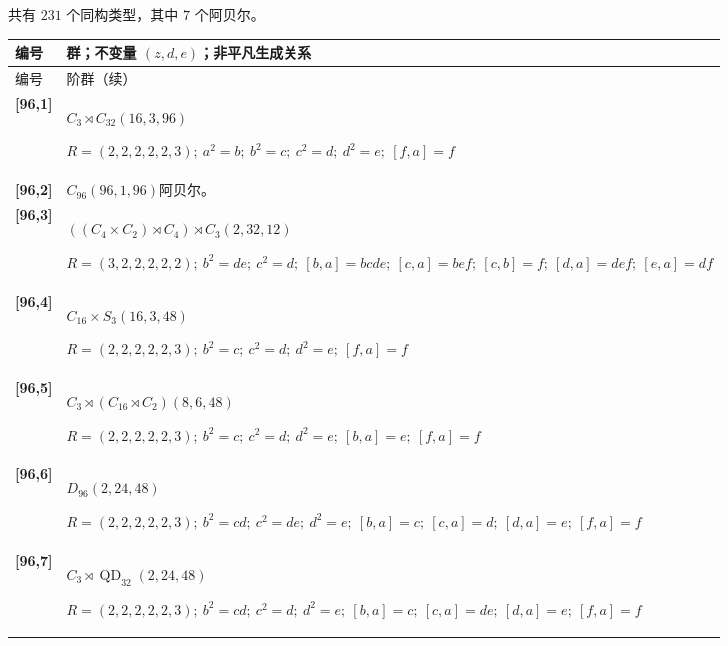 \documentclass[UTF8,fontset=fandol,11pt,a4paper]{ctexart}
\begin{document}
共有 $231$ 个同构类型，其中 $7$ 个阿贝尔。

\begingroup\small\setlength{\tabcolsep}{3pt}\renewcommand{\arraystretch}{1.12}

\begin{longtable}{@{}p{17mm}>{\raggedright\arraybackslash}p{141mm}@{}}

\toprule 编号 & 群；不变量 $(z,d,e)$；非平凡生成关系\\\midrule\endfirsthead

\toprule 编号 & 96 阶群（续）\\\midrule\endhead\bottomrule\endfoot

\textbf{[96,1]} & $C_{3}\rtimes C_{32}$\quad $(16,3,96)$\par\(R=(2,2,2,2,2,3);\allowbreak\ a^{2}=b;\allowbreak\ b^{2}=c;\allowbreak\ c^{2}=d;\allowbreak\ d^{2}=e;\allowbreak\ [f,a]=f\)\\[3pt]

\textbf{[96,2]} & $C_{96}$\quad $(96,1,96)$\quad 阿贝尔。\\[3pt]

\textbf{[96,3]} & $((C_{4}\times C_{2})\rtimes C_{4})\rtimes C_{3}$\quad $(2,32,12)$\par\(R=(3,2,2,2,2,2);\allowbreak\ b^{2}=de;\allowbreak\ c^{2}=d;\allowbreak\ [b,a]=bcde;\allowbreak\ [c,a]=bef;\allowbreak\ [c,b]=f;\allowbreak\ [d,a]=def;\allowbreak\ [e,a]=df\)\\[3pt]

\textbf{[96,4]} & $C_{16}\times S_{3}$\quad $(16,3,48)$\par\(R=(2,2,2,2,2,3);\allowbreak\ b^{2}=c;\allowbreak\ c^{2}=d;\allowbreak\ d^{2}=e;\allowbreak\ [f,a]=f\)\\[3pt]

\textbf{[96,5]} & $C_{3}\rtimes (C_{16}\rtimes C_{2})$\quad $(8,6,48)$\par\(R=(2,2,2,2,2,3);\allowbreak\ b^{2}=c;\allowbreak\ c^{2}=d;\allowbreak\ d^{2}=e;\allowbreak\ [b,a]=e;\allowbreak\ [f,a]=f\)\\[3pt]

\textbf{[96,6]} & $D_{96}$\quad $(2,24,48)$\par\(R=(2,2,2,2,2,3);\allowbreak\ b^{2}=cd;\allowbreak\ c^{2}=de;\allowbreak\ d^{2}=e;\allowbreak\ [b,a]=c;\allowbreak\ [c,a]=d;\allowbreak\ [d,a]=e;\allowbreak\ [f,a]=f\)\\[3pt]

\textbf{[96,7]} & $C_{3}\rtimes \operatorname{QD}_{32}$\quad $(2,24,48)$\par\(R=(2,2,2,2,2,3);\allowbreak\ b^{2}=cd;\allowbreak\ c^{2}=d;\allowbreak\ d^{2}=e;\allowbreak\ [b,a]=c;\allowbreak\ [c,a]=de;\allowbreak\ [d,a]=e;\allowbreak\ [f,a]=f\)\\[3pt]


\end{longtable}
\end{document}
